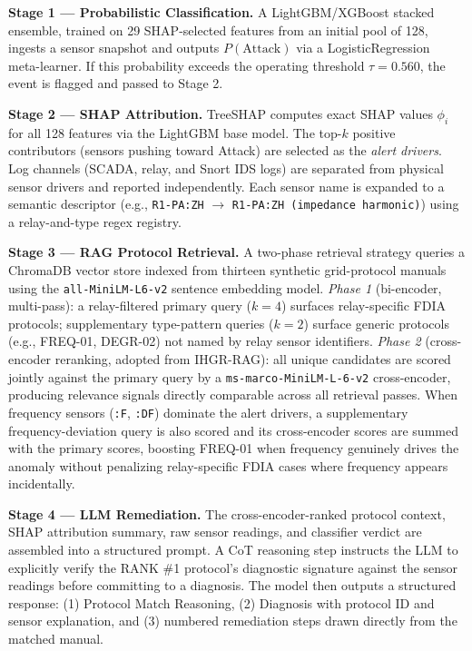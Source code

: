 \documentclass[twocolumn, 10pt, letterpaper]{article}
\begin{document}
\medskip
\noindent
\textbf{Stage 1 --- Probabilistic Classification.}
A LightGBM/XGBoost stacked ensemble, trained on 29 SHAP-selected features from an
initial pool of 128, ingests a sensor snapshot and outputs $P(\text{Attack})$ via a
LogisticRegression meta-learner.
If this probability exceeds the operating threshold $\tau = 0.560$, the event is
flagged and passed to Stage 2.

\medskip
\noindent
\textbf{Stage 2 --- SHAP Attribution.}
TreeSHAP computes exact SHAP values $\phi_i$ for all 128 features via the
LightGBM base model.
The top-$k$ positive contributors (sensors pushing toward Attack) are selected as the
\textit{alert drivers}.
Log channels (SCADA, relay, and Snort IDS logs) are separated from physical sensor
drivers and reported independently.
Each sensor name is expanded to a semantic descriptor
(e.g., \texttt{R1-PA:ZH} $\rightarrow$ \texttt{R1-PA:ZH (impedance harmonic)})
using a relay-and-type regex registry.

\medskip
\noindent
\textbf{Stage 3 --- RAG Protocol Retrieval.}
A two-phase retrieval strategy queries a ChromaDB vector store indexed from
thirteen synthetic grid-protocol manuals using the \texttt{all-MiniLM-L6-v2}
sentence embedding model.
\textit{Phase 1} (bi-encoder, multi-pass): a relay-filtered primary query ($k{=}4$)
surfaces relay-specific FDIA protocols; supplementary type-pattern queries ($k{=}2$)
surface generic protocols (e.g., FREQ-01, DEGR-02) not named by relay sensor identifiers.
\textit{Phase 2} (cross-encoder reranking, adopted from IHGR-RAG): all unique
candidates are scored jointly against the primary query by a
\texttt{ms-marco-MiniLM-L-6-v2} cross-encoder, producing relevance signals directly
comparable across all retrieval passes.
When frequency sensors (\texttt{:F}, \texttt{:DF}) dominate the alert drivers,
a supplementary frequency-deviation query is also scored and its cross-encoder scores
are summed with the primary scores, boosting FREQ-01 when frequency genuinely drives
the anomaly without penalizing relay-specific FDIA cases where frequency appears
incidentally.

\medskip
\noindent
\textbf{Stage 4 --- LLM Remediation.}
The cross-encoder-ranked protocol context, SHAP attribution summary, raw sensor
readings, and classifier verdict are assembled into a structured prompt.
A CoT reasoning step instructs the LLM to explicitly verify the RANK \#1 protocol's
diagnostic signature against the sensor readings before committing to a diagnosis.
The model then outputs a structured response: (1) Protocol Match Reasoning,
(2) Diagnosis with protocol ID and sensor explanation, and (3) numbered remediation
steps drawn directly from the matched manual.
\end{document}
